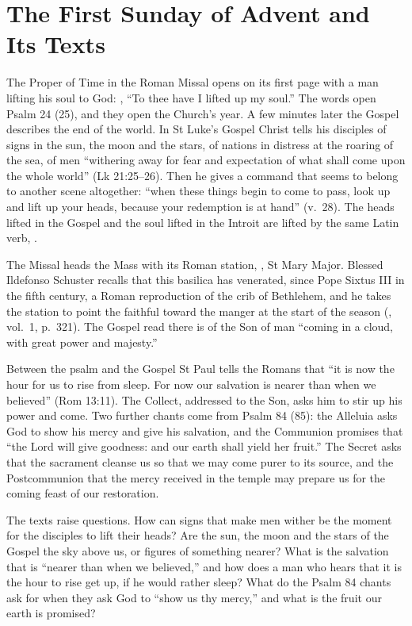 \section{The First Sunday of Advent and Its Texts}
\label{sec:opening}

The Proper of Time in the Roman Missal opens on its first page with a man
lifting his soul to God:
, ``To thee have I lifted up my soul.'' The
words open Psalm 24 (25), and they open the Church's year. A few minutes
later the Gospel describes the end of the world. In St Luke's Gospel Christ tells
his disciples of signs in the sun, the moon and the stars, of nations in
distress at the roaring of the sea, of men ``withering away for fear and
expectation of what shall come upon the whole world'' (Lk 21:25--26). Then he
gives a command that seems to belong to another scene altogether: ``when
these things begin to come to pass, look up and lift up your heads, because
your redemption is at hand'' (v.~28). The heads lifted in the Gospel and the
soul lifted in the Introit are lifted by the same Latin verb, .

The Missal heads the Mass with its Roman station, , St Mary Major. Blessed Ildefonso Schuster
recalls that this basilica has venerated, since Pope Sixtus III in the fifth
century, a Roman reproduction of the crib of Bethlehem, and he takes the
station to point the faithful toward the manger at the start of the season
(, vol.~1, p.~321). The Gospel read there is of the Son
of man ``coming in a cloud, with great power and majesty.''

Between the psalm and the Gospel St Paul tells the Romans that ``it is now
the hour for us to rise from sleep. For now our salvation is nearer than when
we believed'' (Rom 13:11). The Collect, addressed to the Son, asks him to
stir up his power and come. Two further chants come from Psalm 84 (85): the
Alleluia asks God to show his mercy and give his salvation, and the
Communion promises that ``the Lord will give goodness: and our earth shall
yield her fruit.'' The Secret asks that the sacrament cleanse us so that we
may come purer to its source, and the Postcommunion that the mercy received
in the temple may prepare us for the coming feast of our restoration.

The texts raise questions. How can signs that make men wither be the moment
for the disciples to lift their heads? Are the sun, the moon and the stars of
the Gospel the sky above us, or figures of something nearer? What is the
salvation that is ``nearer than when we believed,'' and how does a man who
hears that it is the hour to rise get up, if he would rather sleep? What do
the Psalm 84 chants ask for when they ask God to ``show us thy mercy,'' and
what is the fruit our earth is promised?

